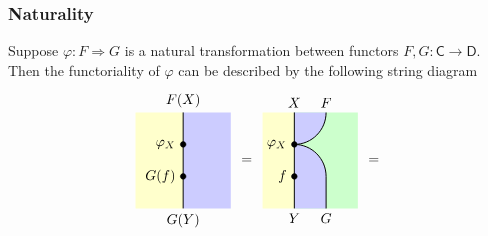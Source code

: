 \subsubsection{Naturality}
Suppose $\varphi:F\Rightarrow G$ is a natural transformation between functors $F,G:\mathsf{C}\to \mathsf{D}$. Then the functoriality of $\varphi$ can be described by the following string diagram
\[
    \begin{tikzpicture}[x=0.8cm,y=0.8cm, baseline=(current bounding box.center)]
        \definecolor{leftcolor}{RGB}{255,255,204} %
        \definecolor{rightcolor}{RGB}{204,204,255} %
        \begin{scope} [shift={(-3.5,0)}]
        \fill[leftcolor] (-0.5,0) rectangle (1,3);
        \fill[rightcolor] (1,0) rectangle (2.5,3);
    
        \draw[line width=0.7pt] (1,0) -- (1,3);
        \filldraw [black] (1,1) circle (2pt) node[left=2pt] {$G(f)$};
        \filldraw [black] (1,2) circle (2pt) node[left=2pt] {$\varphi_X$};
        \draw (1,0) node[below] {$G(Y)$};
        \draw (1,3) node[above] {$F(X)$};
        \draw (3,1.5) node {$=$};
    \end{scope} 
    \begin{scope} 
        \fill[leftcolor] (0,0) rectangle (1,3);
        \fill[green!20] (1,0) rectangle (3,3);
        \begin{scope} 
            \clip (1,0) rectangle (3, 3); 
            \draw[fill=blue!20, rounded corners=0.8cm, line width=0.7pt] (0,2) rectangle (2, 5);
            \draw[fill=blue!20, rounded corners=0.8cm, line width=0.7pt] (0,2) rectangle (2, -1);
        \end{scope} 
    
        \draw[line width=0.7pt] (1,0) -- (1,3);
        \filldraw [black] (1,1) circle (2pt) node[left=2pt] {$f$};
        \filldraw [black] (1,2) circle (2pt) node[left=2pt] {$\varphi_X$};
        \draw (1,0) node[below] {$Y$};
        \draw (1,3) node[above] {$X$};
        \draw (2,0) node[below] {$G$};
        \draw (2,3) node[above] {$F$};
        \draw (3.5,1.5) node {$=$};
    \end{scope} 
        
    \begin{scope} [shift={(4,0)}]
        \definecolor{leftcolor}{RGB}{255,255,204} %
        \definecolor{rightcolor}{RGB}{204,204,255} %
    

\end{scope}
\end{tikzpicture}\]
